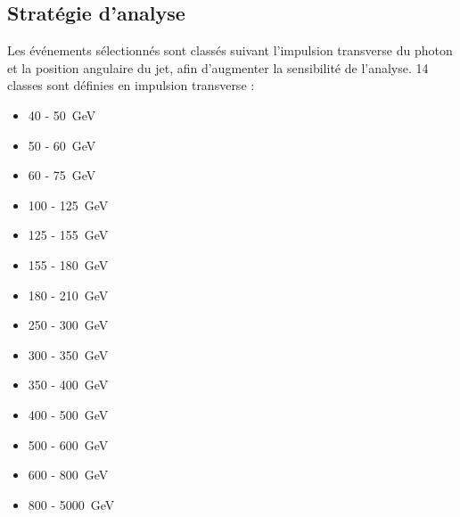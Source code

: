 \subsection{Stratégie d'analyse} \label{sec:jetmet_strategy}

Les événements sélectionnés sont classés suivant l'impulsion transverse du photon et la position angulaire du jet, afin d'augmenter la sensibilité de l'analyse. 14 classes sont définies en impulsion transverse :

\setlength{\columnsep}{0pt}
\begin{multicols}{4}
  \begin{itemize} \setlength{\itemsep}{0.4\itemsep}
      \item 40 - \SI{50}{\GeV}
      \item 50 - \SI{60}{\GeV}
      \item 60 - \SI{75}{\GeV}
      \item 100 - \SI{125}{\GeV}
      \item 125 - \SI{155}{\GeV}
      \item 155 - \SI{180}{\GeV}
      \item 180 - \SI{210}{\GeV}
      \item 250 - \SI{300}{\GeV}
      \item 300 - \SI{350}{\GeV}
      \item 350 - \SI{400}{\GeV}
      \item 400 - \SI{500}{\GeV}
      \item 500 - \SI{600}{\GeV}
      \item 600 - \SI{800}{\GeV}
      \item 800 - \SI{5000}{\GeV}
  \end{itemize}
\end{multicols}

